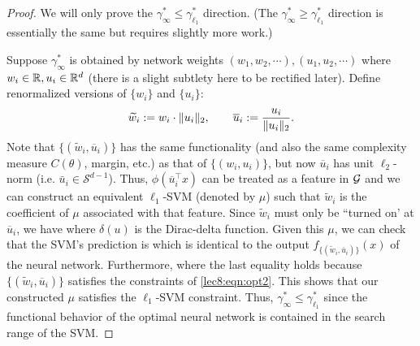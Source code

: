 \begin{proof}

We will only prove the $\gamma_{\infty}^* \leq \gamma_{\ell_1}^*$ direction. (The $\gamma_{\infty}^* \geq \gamma_{\ell_1}^*$ direction is essentially the same but requires slightly more work.)

Suppose $\gamma_\infty^*$ is obtained by network weights $(w_1,w_2, \cdots), (u_1, u_2, \cdots)$ where $w_i\in \mathbb R, u_i\in \mathbb R^d$ (there is a slight subtlety here to be rectified later). Define renormalized versions of $\{w_i\}$ and $\{u_i\}$:
\begin{equation}
\widetilde w_i := w_i\cdot \|u_i\|_2, \qquad \overline u_i := \frac {u_i} {\|u_i\|_2}.   
\end{equation}
Note that $\{(\widetilde w_i, \overline u_i)\}$ has the same functionality (and also the same complexity measure $C(\theta)$, margin, etc.) as that of $\{(w_i,u_i)\}$, but now $\overline u_i$ has unit $\ell_2$-norm (i.e. $\bar{u}_i \in \mathcal{S}^{d-1}$). Thus, $\phi(\overline u_i ^\top x)$ can be treated as a feature in $\mathcal G$ and we can construct an equivalent $\ell_1$-SVM (denoted by $\mu$) such that $\widetilde w_i$ is the coefficient of $\mu$ associated with that feature. Since $\widetilde w_i$ must only be ``turned on' at $\overline u_i $, we have 
where $ \delta(u)$ is the Dirac-delta function. Given this $\mu$, we can check that the SVM's prediction is
which is identical to the output $f_{\{(\widetilde w_i, \overline u_i)\}}(x)$ of the neural network. Furthermore, 
where the last equality holds because $\{(\widetilde w_i, \overline u_i)\}$ satisfies the constraints of \eqref{lec8:eqn:opt2}. This shows that our constructed $\mu$ satisfies the $\ell_1$-SVM constraint. Thus, $\gamma_{\infty}^* \leq \gamma_{\ell_1}^*$ since the functional behavior of the optimal neural network is contained in the search range of the SVM.

\end{proof}

